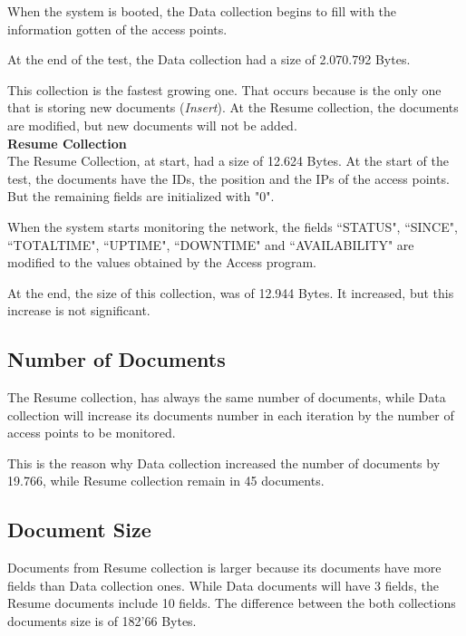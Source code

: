 \documentclass[12pt, a4paper,twoside]{tesi_upf}
\begin{document}
    When the system is booted, the Data collection begins to fill with the information gotten of the access points.
    
    At the end of the test, the Data collection had a size of 2.070.792 Bytes. 
    
    This collection is the fastest growing one. That occurs because is the only one that is storing new documents (\textit{Insert}). At the Resume collection, the documents are modified, but new documents will not be added.\\
    
    \textbf{Resume Collection}\\
    The Resume Collection, at start, had a size of 12.624 Bytes.
    At the start of the test, the documents have the IDs, the position and the IPs of the access points. But the remaining fields are initialized with "0".
    
    When the system starts monitoring the network, the fields ``STATUS", ``SINCE", ``TOTALTIME", ``UPTIME", ``DOWNTIME" and ``AVAILABILITY" are modified to the values obtained by the Access program.
    
    At the end, the size of this collection, was of 12.944 Bytes. It increased, but this increase is not significant.

    \subsection{Number of Documents}
    
    The Resume collection, has always the same number of documents, while Data collection will increase its documents number in each iteration by the number of access points to be monitored.
    
    This is the reason why Data collection increased the number of documents by 19.766, while Resume collection remain in 45 documents.
    
    \subsection{Document Size}
    
    Documents from Resume collection is larger because its documents have more fields than Data collection ones. While Data documents will have 3 fields, the Resume documents include 10 fields. 
    The difference between the both collections documents size is of 182'66 Bytes.
\end{document}
